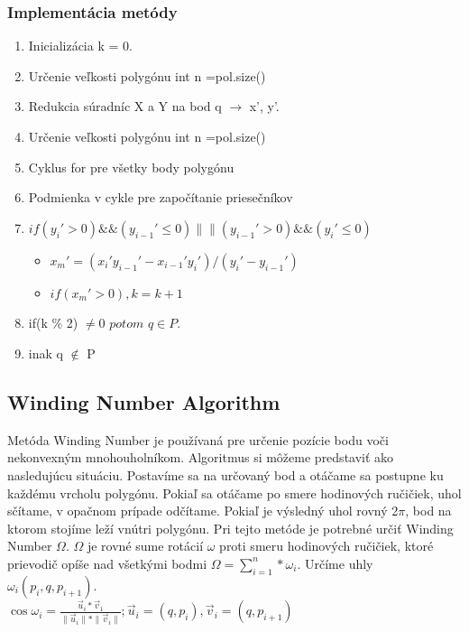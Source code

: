 \documentclass[12pt]{article}
\begin{document}
\subsubsection {Implementácia metódy}
\begin{enumerate}
\item Inicializácia k = 0.
\item Určenie veľkosti polygónu int n =pol.size()
\item Redukcia súradníc X a Y na bod q $\to$ x', y'.
\item Určenie veľkosti polygónu int n =pol.size()
\item Cyklus for pre všetky body polygónu
\item Podmienka v cykle pre započítanie priesečníkov
\item[] $if(y_i' >0) \&\& (y_{i-1}' \leq 0) \|\| (y_{i-1}' > 0) \&\& (y_i' \leq 0)$

\begin{itemize}
\item[] $x_m'=(x_i'y_{i-1}'-x_{i-1}'y_i')/(y_i'-y_{i-1}')$
\item[] $if(x_m'>0), k = k+1$
\end{itemize}

\item if(k \% 2) $\neq 0$ $potom$ $q \in P$.
\item inak q $\notin$ P
\end{enumerate}

\subsection {Winding Number Algorithm}

Metóda Winding Number je používaná pre určenie pozície bodu voči nekonvexným mnohouholníkom. Algoritmus si môžeme predstaviť ako nasledujúcu situáciu. Postavíme sa na určovaný bod a otáčame sa postupne ku každému vrcholu polygónu. Pokiaľ sa otáčame po smere hodinových ručičiek, uhol sčítame, v opačnom prípade odčítame. Pokiaľ je výsledný uhol rovný 2$\pi$, bod na ktorom stojíme leží vnútri polygónu. Pri tejto metóde je potrebné určiť Winding Number $\Omega$. $\Omega$ je rovné sume rotácií $\omega$ proti smeru hodinových ručičiek, ktoré prievodič opíše nad všetkými bodmi $\Omega = \sum_{i=1}^{n}*\omega_i$. Určíme uhly $\omega_i(p_i,q,p_{i+1})$. \\[2pt]

$\cos \omega_i = \frac{\vec u_i *\vec v_1}{\parallel \vec u_i \parallel*\parallel \vec v_i \parallel}; \vec u_i = (q, p_i), \vec v_i = (q, p_{i+1})$ \\[2pt]
\end{document}
